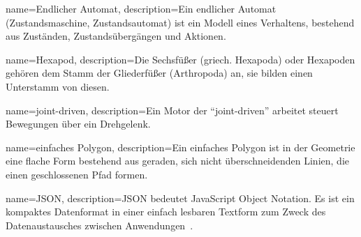%
%


%
%

%
%
{
  name={Endlicher Automat},
  description={Ein endlicher Automat (Zustandsmaschine, Zustandsautomat) ist ein Modell eines Verhaltens,
    bestehend aus Zuständen, Zustandsübergängen und Aktionen.}
}

{
  name={Hexapod},
  description={Die Sechsfüßer (griech. Hexapoda) oder Hexapoden
    gehören dem Stamm der Gliederfüßer (Arthropoda) an,
    sie bilden einen Unterstamm von diesen.}
}

{
  name={joint-driven},
  description={Ein Motor der ``joint-driven'' arbeitet steuert Bewegungen über ein Drehgelenk.}
}

{
  name={einfaches Polygon},
  description={Ein einfaches Polygon ist in der Geometrie eine flache Form bestehend aus geraden,
    sich nicht überschneidenden Linien, die einen geschlossenen Pfad formen.}
}

{
  name={JSON},
  description={JSON bedeutet JavaScript Object Notation.
    Es ist ein kompaktes Datenformat in einer einfach lesbaren Textform
    zum Zweck des Datenaustausches zwischen Anwendungen~\cite{json}.}
}
